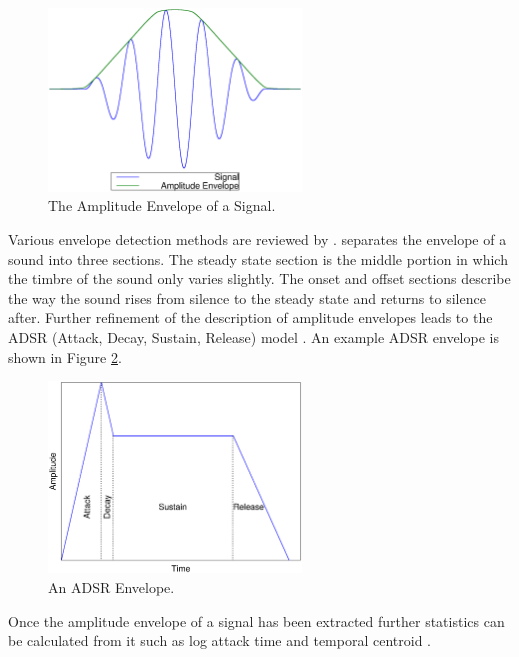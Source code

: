 		\begin{figure}[h!]
			\centering
			\includegraphics[width=0.6\textwidth]{chapter2/Images/AmplitudeEnvelope.eps}
			\caption{The Amplitude Envelope of a Signal.}
			\label{fig:AmplitudeEnvelope}
		\end{figure}

		Various envelope detection methods are reviewed by \citet{chang2007a}. \citet{howard2009acoustics} separates
		the envelope of a sound into three sections. The steady state section is the middle portion in which the
		timbre of the sound only varies slightly. The onset and offset sections describe the way the sound rises
		from silence to the steady state and returns to silence after. Further refinement of the description of
		amplitude envelopes leads to the ADSR (Attack, Decay, Sustain, Release) model \citep{descrivan2012music}. An
		example ADSR envelope is shown in Figure \ref{fig:ADSR}.

		\begin{figure}[h!]
			\centering
			\includegraphics[width=0.6\textwidth]{chapter2/Images/ADSR.eps}
			\caption{An ADSR Envelope.}
			\label{fig:ADSR}
		\end{figure}

		Once the amplitude envelope of a signal has been extracted further statistics can be calculated from it such
		as log attack time and temporal centroid \citep{peeters2000instrument}.

